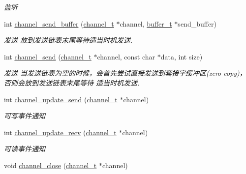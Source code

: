 \begin{DoxyCompactItemize}
\begin{DoxyCompactList}\small\item\em 监听 \end{DoxyCompactList}\item 
int \hyperlink{a00042_a5feb399faecad39ace64e718e9913fbe_a5feb399faecad39ace64e718e9913fbe}{channel\+\_\+send\+\_\+buffer} (\hyperlink{a00047_a2effb3e20d0b7e5f6d5ac42118e0330b_a2effb3e20d0b7e5f6d5ac42118e0330b}{channel\+\_\+t} $\ast$channel, \hyperlink{a00047_aad99a77d28bd81d3d36d0ea569c9482d_aad99a77d28bd81d3d36d0ea569c9482d}{buffer\+\_\+t} $\ast$send\+\_\+buffer)
\begin{DoxyCompactList}\small\item\em 发送 放到发送链表末尾等待适当时机发送. \end{DoxyCompactList}\item 
int \hyperlink{a00042_a455a575d389757e332028a087d701857_a455a575d389757e332028a087d701857}{channel\+\_\+send} (\hyperlink{a00047_a2effb3e20d0b7e5f6d5ac42118e0330b_a2effb3e20d0b7e5f6d5ac42118e0330b}{channel\+\_\+t} $\ast$channel, const char $\ast$data, int size)
\begin{DoxyCompactList}\small\item\em 发送 当发送链表为空的时候，会首先尝试直接发送到套接字缓冲区(zero copy)，否则会放到发送链表末尾等待 适当时机发送. \end{DoxyCompactList}\item 
int \hyperlink{a00042_a92bd8d7a98e233279f011f19f6724794_a92bd8d7a98e233279f011f19f6724794}{channel\+\_\+update\+\_\+send} (\hyperlink{a00047_a2effb3e20d0b7e5f6d5ac42118e0330b_a2effb3e20d0b7e5f6d5ac42118e0330b}{channel\+\_\+t} $\ast$channel)
\begin{DoxyCompactList}\small\item\em 可写事件通知 \end{DoxyCompactList}\item 
int \hyperlink{a00042_ad4aaa94d5f475b4b488ffa1e711ff1e1_ad4aaa94d5f475b4b488ffa1e711ff1e1}{channel\+\_\+update\+\_\+recv} (\hyperlink{a00047_a2effb3e20d0b7e5f6d5ac42118e0330b_a2effb3e20d0b7e5f6d5ac42118e0330b}{channel\+\_\+t} $\ast$channel)
\begin{DoxyCompactList}\small\item\em 可读事件通知 \end{DoxyCompactList}\item 
void \hyperlink{a00042_a44ee392afecbffb25ab7c4de4898df0d_a44ee392afecbffb25ab7c4de4898df0d}{channel\+\_\+close} (\hyperlink{a00047_a2effb3e20d0b7e5f6d5ac42118e0330b_a2effb3e20d0b7e5f6d5ac42118e0330b}{channel\+\_\+t} $\ast$channel)

\end{DoxyCompactItemize}
